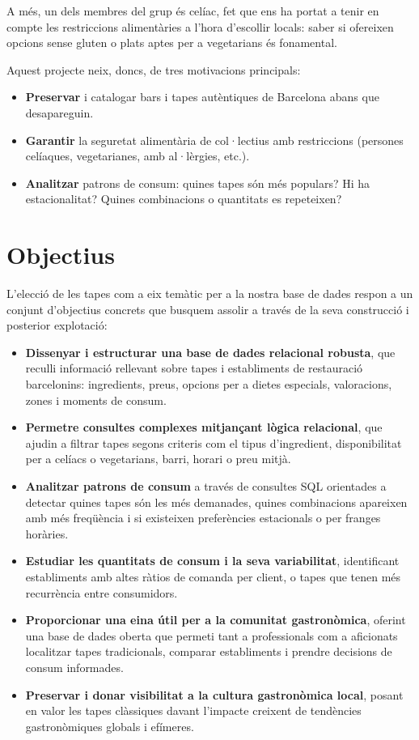\documentclass[12pt,a4paper]{article}
\begin{document}
A més, un dels membres del grup és celíac, fet que ens ha portat a tenir en compte les restriccions alimentàries a l’hora d’escollir locals: saber si ofereixen opcions sense gluten o plats aptes per a vegetarians és fonamental.

Aquest projecte neix, doncs, de tres motivacions principals:
\begin{itemize}
    \item \textbf{Preservar} i catalogar bars i tapes autèntiques de Barcelona abans que desapareguin.
    \item \textbf{Garantir} la seguretat alimentària de col·lectius amb restriccions (persones celíaques, vegetarianes, amb al·lèrgies, etc.).
    \item \textbf{Analitzar} patrons de consum: quines tapes són més populars? Hi ha estacionalitat? Quines combinacions o quantitats es repeteixen?
\end{itemize}
\section{Objectius}

L’elecció de les tapes com a eix temàtic per a la nostra base de dades respon a un conjunt d’objectius concrets que busquem assolir a través de la seva construcció i posterior explotació:

\begin{itemize}
    \item \textbf{Dissenyar i estructurar una base de dades relacional robusta}, que reculli informació rellevant sobre tapes i establiments de restauració barcelonins: ingredients, preus, opcions per a dietes especials, valoracions, zones i moments de consum.

    \item \textbf{Permetre consultes complexes mitjançant lògica relacional}, que ajudin a filtrar tapes segons criteris com el tipus d’ingredient, disponibilitat per a celíacs o vegetarians, barri, horari o preu mitjà.

    \item \textbf{Analitzar patrons de consum} a través de consultes SQL orientades a detectar quines tapes són les més demanades, quines combinacions apareixen amb més freqüència i si existeixen preferències estacionals o per franges horàries.

    \item \textbf{Estudiar les quantitats de consum i la seva variabilitat}, identificant establiments amb altes ràtios de comanda per client, o tapes que tenen més recurrència entre consumidors.

    \item \textbf{Proporcionar una eina útil per a la comunitat gastronòmica}, oferint una base de dades oberta que permeti tant a professionals com a aficionats localitzar tapes tradicionals, comparar establiments i prendre decisions de consum informades.

    \item \textbf{Preservar i donar visibilitat a la cultura gastronòmica local}, posant en valor les tapes clàssiques davant l’impacte creixent de tendències gastronòmiques globals i efímeres.
\end{itemize}
\end{document}

